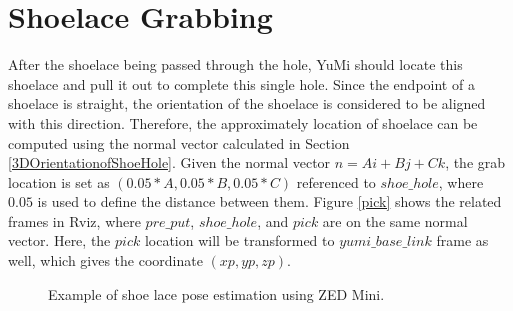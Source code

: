 \section{Shoelace Grabbing} \label{shoelacegrabbing}
After the shoelace being passed through the hole, YuMi should locate this shoelace and pull it out to complete this single hole. Since the endpoint of a shoelace is straight, the orientation of the shoelace is considered to be aligned with this direction. Therefore, the approximately location of shoelace can be computed using the normal vector calculated in Section \ref{3DOrientationofShoeHole}. Given the normal vector $n = Ai + Bj + Ck$, the grab location is set as $(0.05*A, 0.05*B, 0.05*C)$ referenced to $shoe\_hole$, where $0.05$ is used to define the distance between them. Figure \ref{pick} shows the related frames in Rviz, where $pre\_put$, $shoe\_hole$, and $pick$ are on the same normal vector. Here, the $pick$ location will be transformed to $yumi\_base\_link$ frame as well, which gives the coordinate $(xp, yp, zp)$.

\begin{figure}[H]
\centering
{}
\caption{Example of shoe lace pose estimation using ZED Mini.}
\end{figure}

